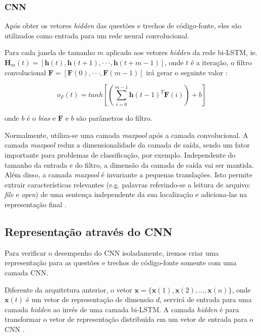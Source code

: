 \subsubsection{CNN}
\label{sec:cnn}

Após obter os vetores \textit{hidden} das questões e trechos de código-fonte, eles são utilizados como entrada para um rede neural convolucional. 

Para cada janela de tamanho $m$ aplicado aos vetores \textit{hidden} da rede bi-LSTM, ie. 
$\bm{H}_{m}(t) = [\bm{h}(t), \bm{h}(t + 1), · · · , \bm{h}(t + m − 1)]$, onde $t$ é a iteração, o filtro convolucional $\bm{F}  = [\bm{F}(0),· · ·, \bm{F}(m − 1)]$ irá gerar o seguinte valor \citep{tan-lstm-qa}:

\begin{equation}
    o_{F}(t) = tanh \left[\left(\sum_{i=0}^{m - 1} \bm{h}(t-1)^{T}\bm{F}(i)\right) + b\right]
\end{equation}

onde $b$ é o \textit{bias} e $\bm{F}$ e $b$ são parâmetros do filtro.

Normalmente, utiliza-se uma camada \textit{maxpool} após a camada convolucional. A camada \textit{maxpool} reduz a dimensionalidade da camada de saída, sendo um fator importante para problemas de classificação, por exemplo. Independente do tamanho da entrada e do filtro, a dimensão da camada de saída vai ser mantida. Além disso, a camada \textit{maxpool} é invariante a pequenas translações. Isto permite extrair características relevantes (e.g. palavras referindo-se a leitura de arquivo: \emph{file} e \emph{open}) de uma sentença independente da sua localização e adiciona-las na representação final \citep{tom-young:trends-deep-learning-nlp}.

\subsection{Representação através do CNN}
\label{sec:representation-cnn}

Para verificar o desempenho do CNN isoladamente, iremos criar uma representação para as questões e trechos de código-fonte somente com uma camada CNN.

Diferente da arquitetura anterior, o vetor $\bm{x} = \{ \bm{x}(1), \bm{x}(2), . . ., \bm{x}(n) \}$, onde $\bm{x}(t)$ é um vetor de representação de dimensão $d$, servirá de entrada para uma camada \textit{hidden} ao invés de uma camada bi-LSTM. A camada \textit{hidden} é para transformar o vetor de representação distribuída em um vetor de entrada para o CNN \citep{tan-lstm-qa}.

